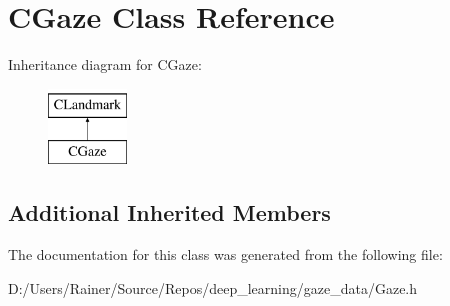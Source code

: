 \hypertarget{class_c_gaze}{}\section{C\+Gaze Class Reference}
\label{class_c_gaze}
Inheritance diagram for C\+Gaze\+:\begin{figure}[H]
\begin{center}
\leavevmode
\includegraphics[height=2.000000cm]{class_c_gaze}
\end{center}
\end{figure}
\subsection*{Additional Inherited Members}


The documentation for this class was generated from the following file\+:\begin{DoxyCompactItemize}
\item 
D\+:/\+Users/\+Rainer/\+Source/\+Repos/deep\+\_\+learning/gaze\+\_\+data/Gaze.\+h\end{DoxyCompactItemize}
